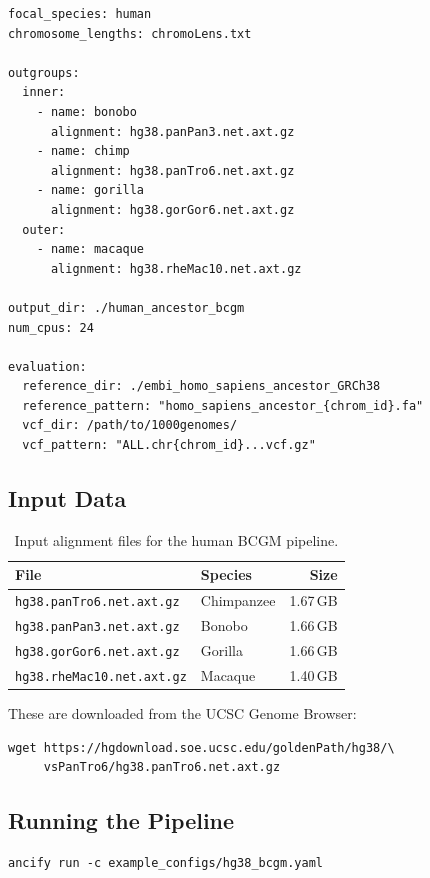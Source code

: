 \documentclass[11pt,a4paper]{article}
\begin{document}
\begin{lstlisting}[style=yamlstyle, caption={Key sections of the hg38 BCGM config.}]
focal_species: human
chromosome_lengths: chromoLens.txt

outgroups:
  inner:
    - name: bonobo
      alignment: hg38.panPan3.net.axt.gz
    - name: chimp
      alignment: hg38.panTro6.net.axt.gz
    - name: gorilla
      alignment: hg38.gorGor6.net.axt.gz
  outer:
    - name: macaque
      alignment: hg38.rheMac10.net.axt.gz

output_dir: ./human_ancestor_bcgm
num_cpus: 24

evaluation:
  reference_dir: ./embi_homo_sapiens_ancestor_GRCh38
  reference_pattern: "homo_sapiens_ancestor_{chrom_id}.fa"
  vcf_dir: /path/to/1000genomes/
  vcf_pattern: "ALL.chr{chrom_id}...vcf.gz"
\end{lstlisting}

\subsection{Input Data}

\begin{table}[H]
\centering
\caption{Input alignment files for the human BCGM pipeline.}
\begin{tabular}{llr}
\toprule
\textbf{File} & \textbf{Species} & \textbf{Size} \\
\midrule
\texttt{hg38.panTro6.net.axt.gz} & Chimpanzee & 1.67\,GB \\
\texttt{hg38.panPan3.net.axt.gz} & Bonobo & 1.66\,GB \\
\texttt{hg38.gorGor6.net.axt.gz} & Gorilla & 1.66\,GB \\
\texttt{hg38.rheMac10.net.axt.gz} & Macaque & 1.40\,GB \\
\bottomrule
\end{tabular}
\end{table}

These are downloaded from the UCSC Genome Browser:
\begin{lstlisting}[style=bashstyle]
wget https://hgdownload.soe.ucsc.edu/goldenPath/hg38/\
     vsPanTro6/hg38.panTro6.net.axt.gz
\end{lstlisting}

\subsection{Running the Pipeline}

\begin{lstlisting}[style=bashstyle]
ancify run -c example_configs/hg38_bcgm.yaml
\end{lstlisting}
\end{document}
